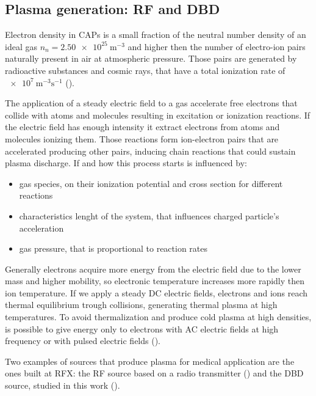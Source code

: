 \subsection{Plasma generation: RF and DBD}
Electron density in CAPs is a small fraction of the neutral number density of an ideal gas $n_{n} = \SI{2.50e25}{\meter^{-3}}$ and higher then the number of electro-ion pairs naturally present in air at atmospheric pressure. Those pairs are generated by radioactive substances and cosmic rays, that have a total ionization rate of $\SI{e7}{\meter^{-3}\second^{-1}}$ (\cite{book:1593058}).

The application of a steady electric field to a gas accelerate free electrons that collide with atoms and molecules resulting in excitation or ionization reactions. If the electric field has enough intensity it extract electrons from atoms and molecules ionizing them. Those reactions form ion-electron pairs that are accelerated producing other pairs, inducing chain reactions that could sustain plasma discharge. If and how this process starts is influenced by:
\begin{itemize}
 \item gas species, on their ionization potential and cross section for different reactions
 \item characteristics lenght of the system, that influences charged particle's acceleration
 \item gas pressure, that is proportional to reaction rates
\end{itemize}

Generally electrons acquire more energy from the electric field due to the lower mass and higher mobility, so electronic temperature increases more rapidly then ion temperature. If we apply a steady DC electric fields, electrons and ions reach thermal equilibrium trough collisions, generating thermal plasma at high temperatures. To avoid thermalization and produce cold plasma at high densities, is possible to give energy only to electrons with AC electric fields at high frequency or with pulsed electric fields (\cite{BARDOS20106705}).


Two examples of sources that produce plasma for medical application are the ones built at RFX: the RF source based on a radio transmitter (\cite{Martines_2009}) and the DBD source, studied in this work (\cite{DeMasi_2018}).

